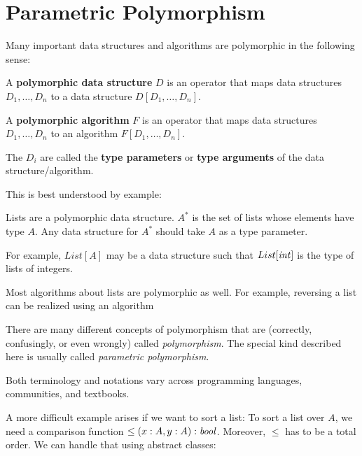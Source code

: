 \section{Parametric Polymorphism}

Many important data structures and algorithms are polymorphic in the following sense:

\begin{definition}[Polymorphism]
A \textbf{polymorphic data structure} $D$ is an operator that maps data structures $D_1,\ldots,D_n$ to a data structure $D[D_1,\ldots,D_n]$.

A \textbf{polymorphic algorithm} $F$ is an operator that maps data structures $D_1,\ldots,D_n$ to an algorithm $F[D_1,\ldots,D_n]$.

The $D_i$ are called the \textbf{type parameters} or \textbf{type arguments} of the data structure/algorithm.
\end{definition}

This is best understood by example:

\begin{example}[Lists]
Lists are a polymorphic data structure.
$A^*$ is the set of lists whose elements have type $A$.
Any data structure for $A^*$ should take $A$ as a type parameter.

For example, $List[A]$ may be a data structure such that $List[\mathit{int}]$ is the type of lists of integers.

Most algorithms about lists are polymorphic as well.
For example, reversing a list can be realized using an algorithm
\begin{acode}
\end{acode}
\end{example}

\begin{terminology}
There are many different concepts of polymorphism that are (correctly, confusingly, or even wrongly) called \emph{polymorphism}.
The special kind described here is usually called \emph{parametric polymorphism}.

Both terminology and notations vary across programming languages, communities, and textbooks.
\end{terminology}

A more difficult example arises if we want to sort a list: To sort a list over $A$, we need a comparison function $\leq(x:A,y:A):\mathit{bool}$.
Moreover, $\leq$ has to be a total order.
We can handle that using abstract classes:

